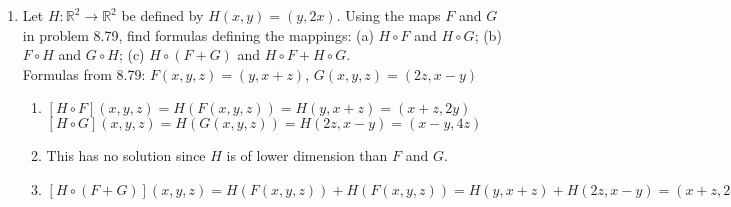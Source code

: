 \documentclass[12pt]{article}
\theoremstyle{definition}
\theoremstyle{plain}
\begin{document}
\begin{enumerate}
\item[8.80] Let $H:\mathbb{R}^2\rightarrow\mathbb{R}^2$ be defined by $H(x,y)=(y,2x)$. Using the maps $F$ and $G$ in problem 8.79, find formulas defining the mappings: (a) $H\circ F$ and $H\circ G$; (b) $F\circ H$ and $G\circ H$; (c) $H\circ(F+G)$ and $H\circ F + H\circ G$.\\
Formulas from 8.79: $F(x,y,z)=(y,x+z)$, $G(x,y,z)=(2z,x-y)$
	\begin{enumerate}
	\item $[H \circ F](x,y,z)=H(F(x,y,z)) = H(y,x+z) = (x+z,2y)$\\
	$[H \circ G](x,y,z)=H(G(x,y,z)) = H(2z,x-y) = (x-y,4z)$
	\item This has no solution since $H$ is of lower dimension than $F$ and $G$.
	\item $[H \circ (F+G)](x,y,z) = H(F(x,y,z)) + H(F(x,y,z)) = H(y,x+z)+H(2z,x-y) = (x+z,2y)+(x-y,4z) = (2x-y+z,2y+4z)$
	\end{enumerate}
	

\end{enumerate}
\end{document}
